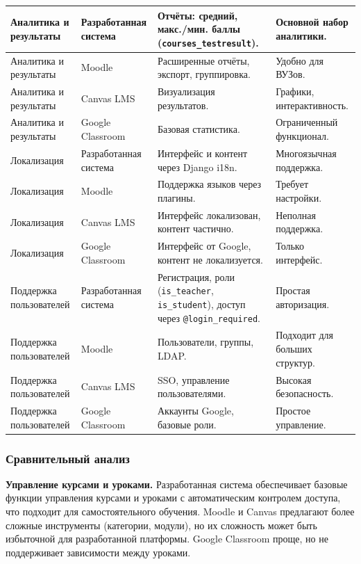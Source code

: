 \begin{xltabular}{\textwidth}{|p{3.1cm}|p{3.1cm}|p{3.5cm}|X|}
	Аналитика и результаты & Разработанная система & Отчёты: средний, макс./мин. баллы (\texttt{courses\_test\-result}). & Основной набор аналитики. \\ \hline
	Аналитика и результаты & Moodle & Расширенные отчёты, экспорт, группировка. & Удобно для ВУЗов. \\ \hline
	Аналитика и результаты & Canvas LMS & Визуализация результатов. & Графики, интерактивность. \\ \hline
	Аналитика и результаты & Google Classroom & Базовая статистика. & Ограниченный функционал. \\ \hline
	
	Локализация & Разработанная система & Интерфейс и контент через Django i18n. & Многоязычная поддержка. \\ \hline
	Локализация & Moodle & Поддержка языков через плагины. & Требует настройки. \\ \hline
	Локализация & Canvas LMS & Интерфейс локализован, контент частично. & Неполная поддержка. \\ \hline
	Локализация & Google Classroom & Интерфейс от Google, контент не локализуется. & Только интерфейс. \\ \hline
	
	Поддержка пользователей & Разработанная система & Регистрация, роли (\texttt{is\_teacher}, \texttt{is\_student}), доступ через \texttt{@login\_required}. & Простая авторизация. \\ \hline
	Поддержка пользователей & Moodle & Пользователи, группы, LDAP. & Подходит для больших структур. \\ \hline
	Поддержка пользователей & Canvas LMS & SSO, управление пользователями. & Высокая безопасность. \\ \hline
	Поддержка пользователей & Google Classroom & Аккаунты Google, базовые роли. & Простое управление. \\ \hline
\end{xltabular}




\subsubsection{Сравнительный анализ}

\textbf{Управление курсами и уроками.} Разработанная система обеспечивает базовые функции управления курсами и уроками с автоматическим контролем доступа, что подходит для самостоятельного обучения. Moodle и Canvas предлагают более сложные инструменты (категории, модули), но их сложность может быть избыточной для разработанной платформы. Google Classroom проще, но не поддерживает зависимости между уроками.

